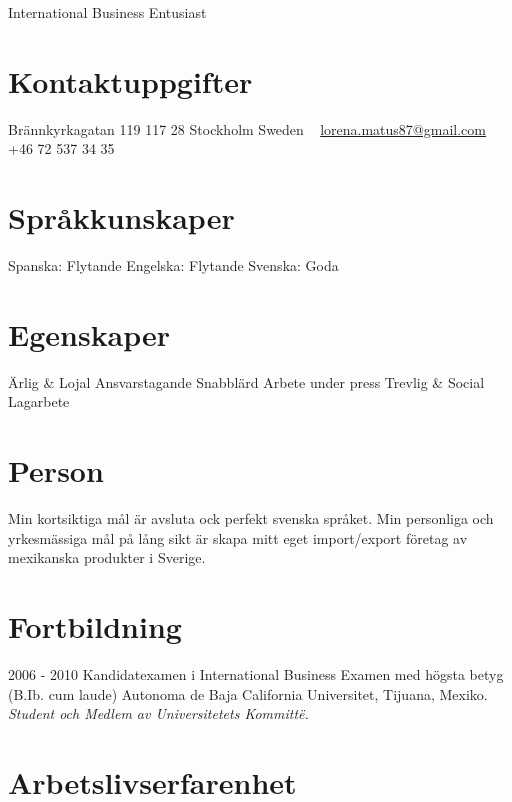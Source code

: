 \documentclass[]{friggeri-cv}
\begin{document}
       {International Business Entusiast}

\begin{aside}
  \section{Kontaktuppgifter}
    Brännkyrkagatan 119
    117 28 Stockholm
    Sweden
    ~
    \href{mailto:lorena.matus87@gmail.com}{lorena.matus87@gmail.com}
    +46 72 537 34 35
  \section{Språkkunskaper}
    Spanska: Flytande
    Engelska: Flytande
    Svenska: Goda
  \section{Egenskaper}
    Ärlig \& Lojal
    Ansvarstagande
    Snabblärd
    Arbete under press
    Trevlig \& Social 
    Lagarbete
\end{aside}

\section{Person}
    Min kortsiktiga mål är avsluta ock perfekt svenska språket.
    Min personliga och yrkesmässiga mål på lång sikt är skapa mitt eget import/export företag av mexikanska produkter i Sverige. 

\section{Fortbildning}

\begin{entrylist}
  \entry
    {2006 - 2010}
    {Kandidatexamen i International Business}
    {Examen med högsta betyg (B.Ib. cum laude)}
    {Autonoma de Baja California Universitet, Tijuana, Mexiko.
    {\emph{Student och Medlem av Universitetets Kommittë.}}}
\end{entrylist}

\section{Arbetslivserfarenhet}
\end{document}
